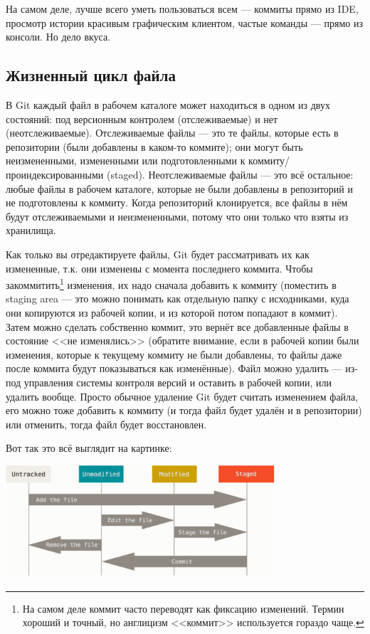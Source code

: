 \documentclass{../../text-style}
\begin{document}
На самом деле, лучше всего уметь пользоваться всем --- коммиты прямо из IDE, просмотр истории красивым графическим клиентом, частые команды --- прямо из консоли. Но дело вкуса.

\subsection{Жизненный цикл файла}

В Git каждый файл в рабочем каталоге может находиться в одном из двух состояний: под версионным контролем (отслеживаемые) и нет (неотслеживаемые). Отслеживаемые файлы --- это те файлы, которые есть в репозитории (были добавлены в каком-то коммите); они могут быть неизмененными, измененными или подготовленными к коммиту/проиндексированными (staged). Неотслеживаемые файлы --- это всё остальное: любые файлы в рабочем каталоге, которые не были добавлены в репозиторий и не подготовлены к коммиту. Когда репозиторий клонируется, все файлы в нём будут отслеживаемыми и неизмененными, потому что они только что взяты из хранилища.

Как только вы отредактируете файлы, Git будет рассматривать их как измененные, т.к. они изменены с момента последнего коммита. Чтобы закоммитить\footnote{На самом деле коммит часто переводят как фиксацию изменений. Термин хороший и точный, но англицизм <<коммит>> используется гораздо чаще.} изменения, их надо сначала добавить к коммиту (поместить в staging area --- это можно понимать как отдельную папку с исходниками, куда они копируются из рабочей копии, и из которой потом попадают в коммит). Затем можно сделать собственно коммит, это вернёт все добавленные файлы в состояние <<не изменялись>> (обратите внимание, если в рабочей копии были изменения, которые к текущему коммиту не были добавлены, то файлы даже после коммита будут показываться как изменённые). Файл можно удалить --- из-под управления системы контроля версий и оставить в рабочей копии, или удалить вообще. Просто обычное удаление Git будет считать изменением файла, его можно тоже добавить к коммиту (и тогда файл будет удалён и в репозитории) или отменить, тогда файл будет восстановлен. 

Вот так это всё выглядит на картинке:

\begin{center}
    \includegraphics[width=0.75\textwidth]{fileLifeCycle.png}
\end{center}
\end{document}
